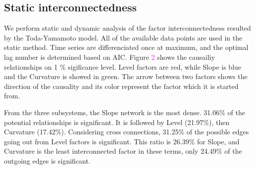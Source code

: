 \documentclass[12pt,bibliography=totoc]{article}
\begin{document}
\subsection{Static interconnectedness}


We perform static and dynamic analysis of the factor interconnectedness resulted by the Toda-Yamamoto model. All of the available data points are used in the static method. Time series are differenciated once at maximum, and the optimal lag number is determined based on AIC. Figure \textcolor{magenta}{2} shows the causailiy relationships on 1 \% sigificance level. Level factors are red, while Slope is blue and the Curvature is showed in green. The arrow between two factors shows the direction of the causality and its color represent the factor which it is started from.


From the three subsystems, the Slope network is the most dense. 31.06\% of the potential relationships is significant. It is followed by Level (21.97\%), then Curvature (17.42\%). Considering cross connections, 31.25\% of the possible edges going out from Level factors is significant. This ratio is 26.39\% for Slope, and Curvature is the least interconnected factor in these terms, only 24.49\% of the outgoing edges is significant.
\end{document}
